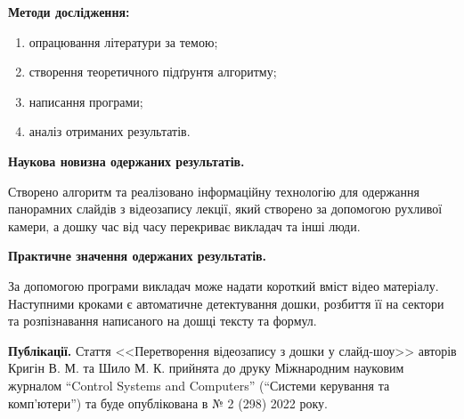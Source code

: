 \textbf{Методи дослідження:}
\begin{enumerate}
      \item опрацювання літератури за темою;
      \item створення теоретичного підґрунтя алгоритму;
      \item написання програми;
      \item аналіз отриманих результатів.
\end{enumerate}

\textbf{Наукова новизна одержаних результатів.}

Створено алгоритм та реалізовано інформаційну технологію
для одержання панорамних слайдів з відеозапису лекції,
який створено за допомогою рухливої камери,
а дошку час від часу перекриває викладач та інші люди.

\textbf{Практичне значення одержаних результатів.}

За допомогою програми викладач може надати короткий вміст
відео матеріалу. Наступними кроками є автоматичне детектування
дошки, розбиття її на сектори та розпізнавання написаного на
дошці тексту та формул.

\textbf{Публікації.}
Стаття <<Перетворення відеозапису з дошки у слайд-шоу>> авторів 
Кригін В. М. та Шило М. К. прийнята до друку 
Міжнародним науковим журналом “Control Systems and Computers”
(“Системи керування та комп'ютери”) та буде опублікована в № 2 (298) 2022 року.
